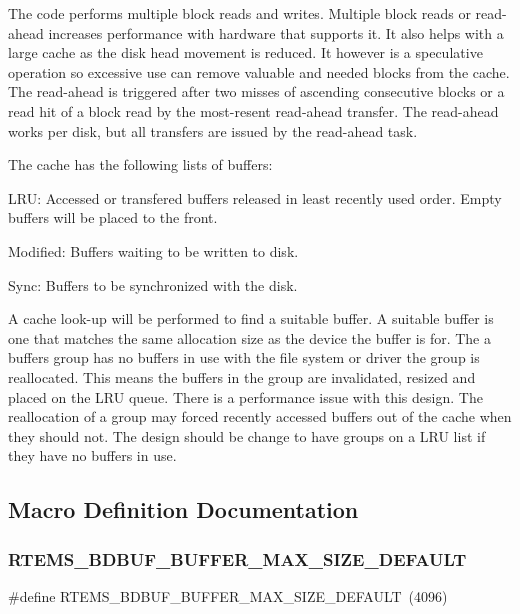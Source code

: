 The code performs multiple block reads and writes. Multiple block reads or read-\/ahead increases performance with hardware that supports it. It also helps with a large cache as the disk head movement is reduced. It however is a speculative operation so excessive use can remove valuable and needed blocks from the cache. The read-\/ahead is triggered after two misses of ascending consecutive blocks or a read hit of a block read by the most-\/resent read-\/ahead transfer. The read-\/ahead works per disk, but all transfers are issued by the read-\/ahead task.

The cache has the following lists of buffers\+:
\begin{DoxyItemize}
\item L\+RU\+: Accessed or transfered buffers released in least recently used order. Empty buffers will be placed to the front.
\item Modified\+: Buffers waiting to be written to disk.
\item Sync\+: Buffers to be synchronized with the disk.
\end{DoxyItemize}

A cache look-\/up will be performed to find a suitable buffer. A suitable buffer is one that matches the same allocation size as the device the buffer is for. The a buffer\textquotesingle{}s group has no buffers in use with the file system or driver the group is reallocated. This means the buffers in the group are invalidated, resized and placed on the L\+RU queue. There is a performance issue with this design. The reallocation of a group may forced recently accessed buffers out of the cache when they should not. The design should be change to have groups on a L\+RU list if they have no buffers in use. 

\subsection{Macro Definition Documentation}
\mbox{\label{group__rtems__bdbuf_ga3de9417ce0cc9bce90e924796c191cc2}} 
\subsubsection{\texorpdfstring{RTEMS\_BDBUF\_BUFFER\_MAX\_SIZE\_DEFAULT}{RTEMS\_BDBUF\_BUFFER\_MAX\_SIZE\_DEFAULT}}
{\footnotesize\ttfamily \#define R\+T\+E\+M\+S\+\_\+\+B\+D\+B\+U\+F\+\_\+\+B\+U\+F\+F\+E\+R\+\_\+\+M\+A\+X\+\_\+\+S\+I\+Z\+E\+\_\+\+D\+E\+F\+A\+U\+LT~(4096)}

